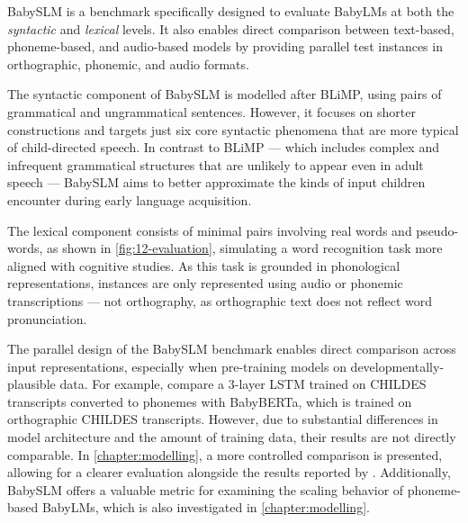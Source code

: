 

BabySLM \citep{lavechin} is a benchmark specifically designed to evaluate BabyLMs at both the \emph{syntactic} and \emph{lexical} levels. It also enables direct comparison between text-based, phoneme-based, and audio-based models by providing parallel test instances in orthographic, phonemic, and audio formats.

The syntactic component of BabySLM is modelled after BLiMP, using pairs of grammatical and ungrammatical sentences. However, it focuses on shorter constructions and targets just six core syntactic phenomena that are more typical of child-directed speech. In contrast to BLiMP --- which includes complex and infrequent grammatical structures that are unlikely to appear even in adult speech --- BabySLM aims to better approximate the kinds of input children encounter during early language acquisition.

The lexical component consists of minimal pairs involving real words and pseudo-words, as shown in \cref{fig:12-evaluation}, simulating a word recognition task more aligned with cognitive studies. As this task is grounded in phonological representations, instances are only represented using audio or phonemic transcriptions --- not orthography, as orthographic text does not reflect word pronunciation. 

The parallel design of the BabySLM benchmark enables direct comparison across input representations, especially when pre-training models on developmentally-plausible data. For example, \citet{lavechin} compare a 3-layer LSTM trained on CHILDES transcripts converted to phonemes with BabyBERTa, which is trained on orthographic CHILDES transcripts. However, due to substantial differences in model architecture and the amount of training data, their results are not directly comparable. In \cref{chapter:modelling}, a more controlled comparison is presented, allowing for a clearer evaluation alongside the results reported by \citet{lavechin}. Additionally, BabySLM offers a valuable metric for examining the scaling behavior of phoneme-based BabyLMs, which is also investigated in \cref{chapter:modelling}. 

